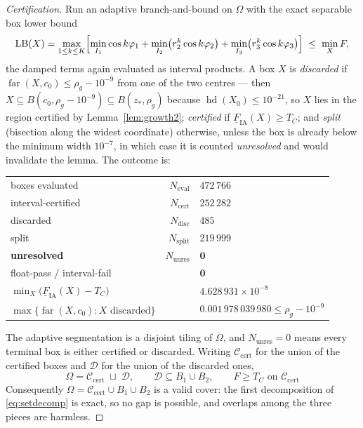\documentclass[11pt]{article}
\theoremstyle{remark}
\newcommand{\Om}{\Omega}
\newcommand{\hd}{\operatorname{hd}}
\newcommand{\far}{\operatorname{far}}
\begin{document}
\begin{proof}[Certification]
Run an adaptive branch-and-bound on $\Om$ with the exact separable box lower bound
\[
\mathrm{LB}(X)=\max_{1\le k\le K}\Bigl[\min_{I_1}\cos k\varphi_1+\min_{I_2}\bigl(r_2^k\cos k\varphi_2\bigr)
+\min_{I_3}\bigl(r_3^k\cos k\varphi_3\bigr)\Bigr]\;\le\;\min_X F ,
\]
the damped terms again evaluated as interval products. A box $X$ is
\emph{discarded} if $\far(X,c_0)\le\rho_g-10^{-9}$ from one of the two centres --- then
$X\subseteq B(c_0,\rho_g-10^{-9})\subseteq B(z_*,\rho_g)$ because $\hd(X_0)\le10^{-21}$, so $X$ lies in the
region certified by Lemma~\ref{lem:growth2}; \emph{certified} if
$\underline F_{\mathrm{IA}}(X)\ge T_C$; and \emph{split} (bisection along the widest coordinate) otherwise,
unless the box is already below the minimum width $10^{-7}$, in which case it is counted
\emph{unresolved} and would invalidate the lemma. The outcome is:
\begin{center}
\begin{tabular}{lrl}
\toprule
boxes evaluated & $N_{\mathrm{eval}}$ & $472\,766$\\
interval-certified & $N_{\mathrm{cert}}$ & $252\,282$\\
discarded & $N_{\mathrm{disc}}$ & $485$\\
split & $N_{\mathrm{split}}$ & $219\,999$\\
\textbf{unresolved} & $N_{\mathrm{unres}}$ & $\mathbf 0$\\
float-pass / interval-fail & & $\mathbf 0$\\
$\min_X\bigl(\underline F_{\mathrm{IA}}(X)-T_C\bigr)$ & & $4.628\,931\times10^{-8}$\\
$\max\{\far(X,c_0):X\text{ discarded}\}$ & & $0.001\,978\,039\,980\le\rho_g-10^{-9}$\\
\bottomrule
\end{tabular}
\end{center}
The adaptive segmentation is a disjoint tiling of $\Om$, and $N_{\mathrm{unres}}=0$ means every terminal
box is either certified or discarded. Writing $\mathcal C_{\mathrm{cert}}$ for the union of the certified
boxes and $\mathcal D$ for the union of the discarded ones,
\begin{equation}\label{eq:setdecomp}
\boxed{\;\Om=\mathcal C_{\mathrm{cert}}\;\sqcup\;\mathcal D,\qquad
\mathcal D\subseteq B_1\cup B_2,\qquad F\ge T_C \text{ on }\mathcal C_{\mathrm{cert}}\;}
\end{equation}
Consequently $\Om=\mathcal C_{\mathrm{cert}}\cup B_1\cup B_2$ is a valid cover: the first decomposition of
\eqref{eq:setdecomp} is exact, so no gap is possible, and overlaps among the three pieces are harmless.
\end{proof}
\end{document}

